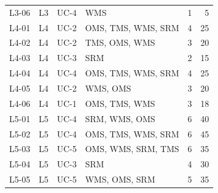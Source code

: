 \begin{longtable}{@{}llllrr@{}}
L3-06 & L3 & UC-4 & WMS               & 1 & 5  \\
L4-01 & L4 & UC-2 & OMS, TMS, WMS, SRM & 4 & 25 \\
L4-02 & L4 & UC-2 & TMS, OMS, WMS     & 3 & 20 \\
L4-03 & L4 & UC-3 & SRM               & 2 & 15 \\
L4-04 & L4 & UC-4 & OMS, TMS, WMS, SRM & 4 & 25 \\
L4-05 & L4 & UC-2 & WMS, OMS          & 3 & 20 \\
L4-06 & L4 & UC-1 & OMS, TMS, WMS     & 3 & 18 \\
L5-01 & L5 & UC-4 & SRM, WMS, OMS     & 6 & 40 \\
L5-02 & L5 & UC-4 & OMS, TMS, WMS, SRM & 6 & 45 \\
L5-03 & L5 & UC-5 & OMS, WMS, SRM, TMS & 6 & 35 \\
L5-04 & L5 & UC-3 & SRM               & 4 & 30 \\
L5-05 & L5 & UC-5 & WMS, OMS, SRM     & 5 & 35 \\
\bottomrule
\end{longtable}
